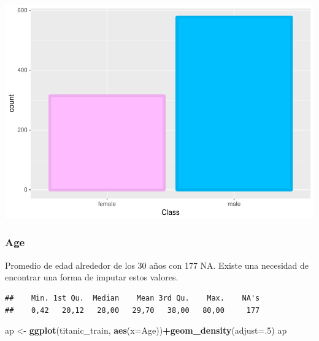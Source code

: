 \documentclass[]{article}
\newenvironment{Shaded}{\begin{snugshade}}{\end{snugshade}}
\newcommand{\KeywordTok}[1]{\textcolor[rgb]{0.13,0.29,0.53}{\textbf{#1}}}
\newcommand{\DataTypeTok}[1]{\textcolor[rgb]{0.13,0.29,0.53}{#1}}
\newcommand{\DecValTok}[1]{\textcolor[rgb]{0.00,0.00,0.81}{#1}}
\newcommand{\StringTok}[1]{\textcolor[rgb]{0.31,0.60,0.02}{#1}}
\newcommand{\CommentTok}[1]{\textcolor[rgb]{0.56,0.35,0.01}{\textit{#1}}}
\newcommand{\OperatorTok}[1]{\textcolor[rgb]{0.81,0.36,0.00}{\textbf{#1}}}
\newcommand{\NormalTok}[1]{#1}
\begin{document}
\includegraphics{titanicDataClean_files/figure-latex/var_sex-1.pdf}

\subsubsection{Age}\label{age}

Promedio de edad alrededor de los 30 años con 177 NA. Existe una
necesidad de encontrar una forma de imputar estos valores.

\begin{Shaded}
\end{Shaded}

\begin{verbatim}
##    Min. 1st Qu.  Median    Mean 3rd Qu.    Max.    NA's 
##    0,42   20,12   28,00   29,70   38,00   80,00     177
\end{verbatim}

\begin{Shaded}
\begin{Highlighting}[]
\NormalTok{ap <-}\StringTok{ }\KeywordTok{ggplot}\NormalTok{(titanic_train, }\KeywordTok{aes}\NormalTok{(}\DataTypeTok{x=}\NormalTok{Age))}\OperatorTok{+}\KeywordTok{geom_density}\NormalTok{(}\DataTypeTok{adjust=}\NormalTok{.}\DecValTok{5}\NormalTok{)}
\NormalTok{ap}
\end{Highlighting}
\end{Shaded}
\end{document}
